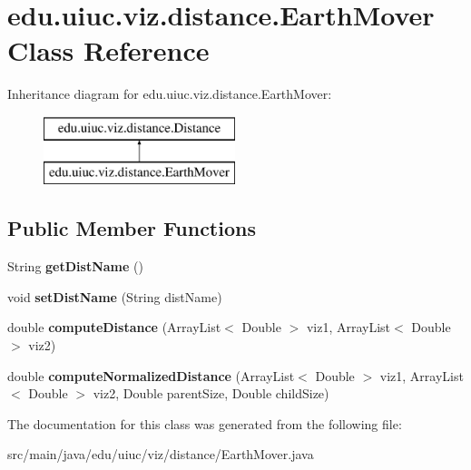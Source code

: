 \hypertarget{classedu_1_1uiuc_1_1viz_1_1distance_1_1_earth_mover}{}\section{edu.\+uiuc.\+viz.\+distance.\+Earth\+Mover Class Reference}
\label{classedu_1_1uiuc_1_1viz_1_1distance_1_1_earth_mover}
Inheritance diagram for edu.\+uiuc.\+viz.\+distance.\+Earth\+Mover\+:\begin{figure}[H]
\begin{center}
\leavevmode
\includegraphics[height=2.000000cm]{classedu_1_1uiuc_1_1viz_1_1distance_1_1_earth_mover}
\end{center}
\end{figure}
\subsection*{Public Member Functions}
\begin{DoxyCompactItemize}
\item 
\mbox{\label{classedu_1_1uiuc_1_1viz_1_1distance_1_1_earth_mover_a7880c0cc4efc520fd13253e6d53f13ff}} 
String {\bfseries get\+Dist\+Name} ()
\item 
\mbox{\label{classedu_1_1uiuc_1_1viz_1_1distance_1_1_earth_mover_ad56c9d30efd2625897c7829b313911cb}} 
void {\bfseries set\+Dist\+Name} (String dist\+Name)
\item 
\mbox{\label{classedu_1_1uiuc_1_1viz_1_1distance_1_1_earth_mover_abbb2dc5398f0f86a54aceb5f22c8768d}} 
double {\bfseries compute\+Distance} (Array\+List$<$ Double $>$ viz1, Array\+List$<$ Double $>$ viz2)
\item 
\mbox{\label{classedu_1_1uiuc_1_1viz_1_1distance_1_1_earth_mover_a07fb32b0de8f6eb719af7ca05f87ec31}} 
double {\bfseries compute\+Normalized\+Distance} (Array\+List$<$ Double $>$ viz1, Array\+List$<$ Double $>$ viz2, Double parent\+Size, Double child\+Size)
\end{DoxyCompactItemize}


The documentation for this class was generated from the following file\+:\begin{DoxyCompactItemize}
\item 
src/main/java/edu/uiuc/viz/distance/Earth\+Mover.\+java\end{DoxyCompactItemize}
